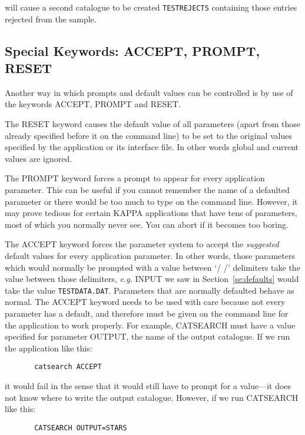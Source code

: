will cause a second catalogue to be created {\tt TESTREJECTS} containing
those entries rejected from the sample.

\subsection{Special Keywords: ACCEPT, PROMPT, RESET}
\label{se:iclkey}

Another way in which prompts and default values can be controlled is by use of
the keywords ACCEPT, PROMPT and RESET.

The RESET keyword causes the default value of all parameters (apart from those
already specified before it on the command line) to be set to the original
values specified by the application or its interface file.  In other words
global and current values are ignored.

The PROMPT keyword forces a prompt to appear for every application parameter.
This can be useful if you cannot remember the name of a defaulted parameter or
there would be too much to type on the command line.  However, it may prove
tedious for certain {\small KAPPA} applications that have tens of parameters,
most of which you normally never see.  You can abort if it becomes too boring.

The ACCEPT keyword forces the parameter system to accept the {\em suggested}
default values for every application parameter.  In other words, those
parameters which would normally be prompted with a value between `/ /'
delimiters take the value between those delimiters, {\it e.g.}  INPUT we saw in
Section~\ref{se:defaults} would take the value {\tt TESTDATA.DAT}.  Parameters
that are normally defaulted behave as normal.  The ACCEPT keyword needs to be
used with care because not every parameter has a default, and therefore must be
given on the command line for the application to work properly. For example,
CATSEARCH must have a value specified for parameter OUTPUT, the name of the
output catalogue. If we run the application like this:

\begin{verbatim}
       catsearch ACCEPT
\end{verbatim}

it would fail in the sense that it would still have to prompt for a value---it
does not know where to write the output catalogue. However, if we run CATSEARCH
like this:

\begin{verbatim}
       CATSEARCH OUTPUT=STARS
\end{verbatim}

